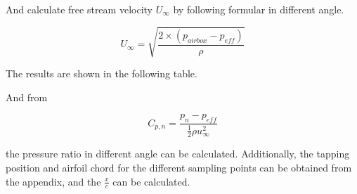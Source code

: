 And calculate free stream velocity $U_\infty$ by following formular in different angle.


\begin{equation}
    \label{Peff}
    U_{\infty}={\sqrt{\frac{2\times(p_{airbox}-p_{eff})}{\rho}}}
    \end{equation}

The results are shown in the following table.

\begin{table}[]
    \end{table}


And from

\begin{equation}
    \label{Peff}
    C_{p,n}={\frac{p_n-p_{eff}}{{\frac{1}{2}}\rho u_{\infty}^{2}}}
    \end{equation}

the pressure ratio in different angle can be calculated. Additionally, the tapping position and airfoil chord for the different sampling points can be obtained from the appendix, and the $\frac{x}{c}$ can be calculated.



